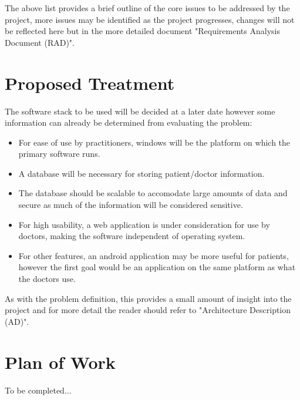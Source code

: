 \documentclass[a4paper]{article}
\begin{document}
	The above list provides a brief outline of the core issues to be addressed by the project, more issues may be identified as the project progresses, changes will not be reflected here but in the more detailed document "Requirements Analysis Document (RAD)".

\section*{Proposed Treatment}
	The software stack to be used will be decided at a later date however some information can already be determined from evaluating the problem:
	\begin{itemize}
		\item For ease of use by practitioners, windows will be the platform on which the primary software runs.
		\item A database will be necessary for storing patient/doctor information.
		\item The database should be scalable to accomodate large amounts of data and secure as much of the information will be considered sensitive.
		\item For high usability, a web application is under consideration for use by doctors, making the software independent of operating system.
		\item For other features, an android application may be more useful for patients, however the first goal would be an application on the same platform as what the doctors use. 
	\end{itemize}

	As with the problem definition, this provides a small amount of insight into the project and for more detail the reader should refer to "Architecture Description (AD)".
	
\section*{Plan of Work}
	To be completed...
	
\end{document}
